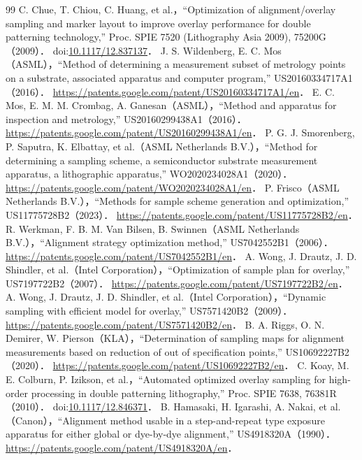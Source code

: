 \begin{thebibliography}{99}
 C. Chue, T. Chiou, C. Huang, et al.，``Optimization of alignment/overlay sampling and marker layout to improve overlay performance for double patterning technology,'' Proc. SPIE 7520 (Lithography Asia 2009), 75200G（2009）． doi:\href{https://doi.org/10.1117/12.837137}{10.1117/12.837137}．
 J. S. Wildenberg, E. C. Mos（ASML），``Method of determining a measurement subset of metrology points on a substrate, associated apparatus and computer program,'' US20160334717A1（2016）． \url{https://patents.google.com/patent/US20160334717A1/en}．
 E. C. Mos, E. M. M. Crombag, A. Ganesan（ASML），``Method and apparatus for inspection and metrology,'' US20160299438A1（2016）． \url{https://patents.google.com/patent/US20160299438A1/en}．
 P. G. J. Smorenberg, P. Saputra, K. Elbattay, et al.（ASML Netherlands B.V.），``Method for determining a sampling scheme, a semiconductor substrate measurement apparatus, a lithographic apparatus,'' WO2020234028A1（2020）． \url{https://patents.google.com/patent/WO2020234028A1/en}．
 P. Frisco（ASML Netherlands B.V.），``Methods for sample scheme generation and optimization,'' US11775728B2（2023）． \url{https://patents.google.com/patent/US11775728B2/en}．
 R. Werkman, F. B. M. Van Bilsen, B. Swinnen（ASML Netherlands B.V.），``Alignment strategy optimization method,'' US7042552B1（2006）． \url{https://patents.google.com/patent/US7042552B1/en}．
 A. Wong, J. Drautz, J. D. Shindler, et al.（Intel Corporation），``Optimization of sample plan for overlay,'' US7197722B2（2007）． \url{https://patents.google.com/patent/US7197722B2/en}．
 A. Wong, J. Drautz, J. D. Shindler, et al.（Intel Corporation），``Dynamic sampling with efficient model for overlay,'' US7571420B2（2009）． \url{https://patents.google.com/patent/US7571420B2/en}．
 B. A. Riggs, O. N. Demirer, W. Pierson（KLA），``Determination of sampling maps for alignment measurements based on reduction of out of specification points,'' US10692227B2（2020）． \url{https://patents.google.com/patent/US10692227B2/en}．
 C. Koay, M. E. Colburn, P. Izikson, et al.，``Automated optimized overlay sampling for high-order processing in double patterning lithography,'' Proc. SPIE 7638, 76381R（2010）． doi:\href{https://doi.org/10.1117/12.846371}{10.1117/12.846371}．
 B. Hamasaki, H. Igarashi, A. Nakai, et al.（Canon），``Alignment method usable in a step-and-repeat type exposure apparatus for either global or dye-by-dye alignment,'' US4918320A（1990）． \url{https://patents.google.com/patent/US4918320A/en}．

\end{thebibliography}
